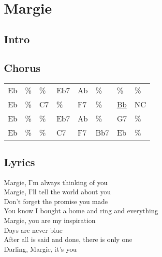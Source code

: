 \section{Margie}


\subsection*{Intro}


\subsection*{Chorus}


\begin{tabular}{l l l l l l l l}
Eb & \% & \% & Eb7 & Ab & \% & \% & \% \\ 
Eb & \% & C7 & \% & F7 & \% & \underline{Bb} & NC \\ 
Eb & \% & \% & Eb7 & Ab & \% & G7 & \% \\ 
Eb & \% & \% & C7 & F7 & Bb7 & Eb & \% \\ 
\end{tabular}


\subsection*{Lyrics}


Margie, I'm always thinking of you \\ 
Margie, I'll tell the world about you \\ 
Don't forget the promise you made \\ 
You know I bought a home and ring and everything \\ 
Margie, you are my inspiration \\ 
Days are never blue \\ 
After all is said and done, there is only one \\ 
Darling, Margie, it's you \\ 
